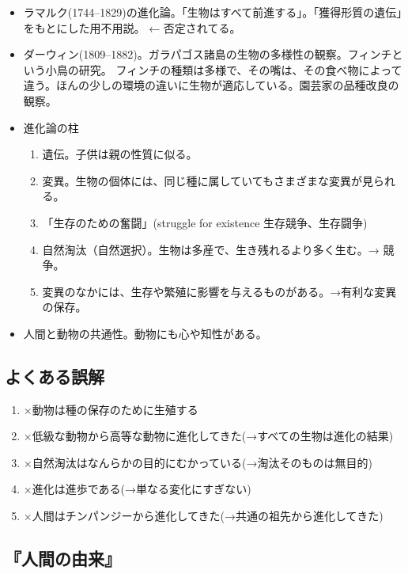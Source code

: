 \documentclass[uplatex,dvipdfmx]{jsarticle}
\begin{document}
\begin{itemize}
\item ラマルク(1744--1829)の進化論。「生物はすべて前進する」。「獲得形質の遺伝」をもとにした用不用説。 ← 否定されてる。
\item ダーウィン(1809--1882)。ガラパゴス諸島の生物の多様性の観察。フィンチという小鳥の研究。
  フィンチの種類は多様で、その嘴は、その食べ物によって違う。ほんの少しの環境の違いに生物が適応している。園芸家の品種改良の観察。
\item 進化論の柱
  \begin{enumerate}
  \item 遺伝。子供は親の性質に似る。
  \item 変異。生物の個体には、同じ種に属していてもさまざまな変異が見られる。
  \item 「生存のための奮闘」(struggle for existence 生存競争、生存闘争)
  \item 自然淘汰（自然選択）。生物は多産で、生き残れるより多く生む。→ 競争。
  \item 変異のなかには、生存や繁殖に影響を与えるものがある。→有利な変異の保存。
  \end{enumerate}
\item 人間と動物の共通性。動物にも心や知性がある。
\end{itemize}




\subsection{よくある誤解}

\begin{enumerate}

 \item ×動物は種の保存のために生殖する
 \item ×低級な動物から高等な動物に進化してきた(→すべての生物は進化の結果)
 \item ×自然淘汰はなんらかの目的にむかっている(→淘汰そのものは無目的)
 \item ×進化は進歩である(→単なる変化にすぎない)
 \item ×人間はチンパンジーから進化してきた(→共通の祖先から進化してきた)

\end{enumerate}


\subsection{『人間の由来』}
\end{document}

